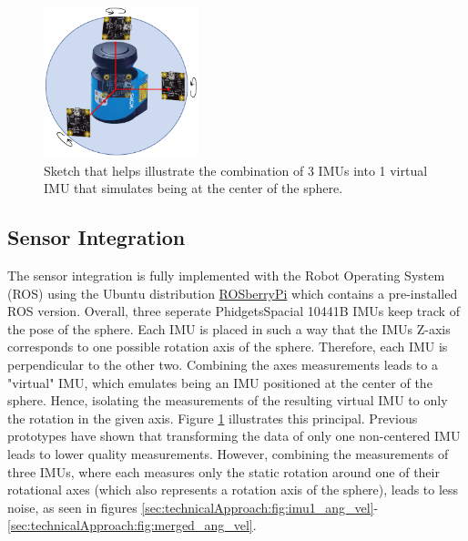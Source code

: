 \begin{figure}                                                                                                                                                                                                    
\centering
\includegraphics[width=0.4\textwidth]{../Media/virtualIMU.png}                                                                                                                                                      
\caption{Sketch that helps illustrate the combination of 3 IMUs into 1 virtual IMU that simulates being at the center of the sphere.}                                                                                                                           
\label{sec:SensorIntegration:fig:virtual}                                                                                                                                                                       
\end{figure}                                                                                                                                                                                                      

\subsection{Sensor Integration}
\label{sec:TechnicalApproach:sensorintegration}

The sensor integration is fully implemented with the Robot Operating System (ROS) using the Ubuntu distribution \href{http://wiki.ros.org/ROSberryPi}{ROSberryPi} which contains a pre-installed ROS version.
Overall, three seperate PhidgetsSpacial 10441B IMUs \cite{imuphidgets} keep track of the pose of the sphere. Each IMU is placed in such a way that the IMUs Z-axis corresponds to one possible rotation axis of the sphere.
Therefore, each IMU is perpendicular to the other two.
Combining the axes measurements leads to a "virtual" IMU, which emulates being an IMU positioned at the center of the sphere. 
Hence, isolating the measurements of the resulting virtual IMU to only the rotation in the given axis.
Figure \ref{sec:SensorIntegration:fig:virtual} illustrates this principal.
Previous prototypes have shown that transforming the data of only one non-centered IMU leads to lower quality measurements.
However, combining the measurements of three IMUs, where each measures only the static rotation around one of their rotational axes (which also represents a rotation axis of the sphere), leads to less noise, as seen in figures  \ref{sec:technicalApproach:fig:imu1_ang_vel}-\ref{sec:technicalApproach:fig:merged_ang_vel}.

